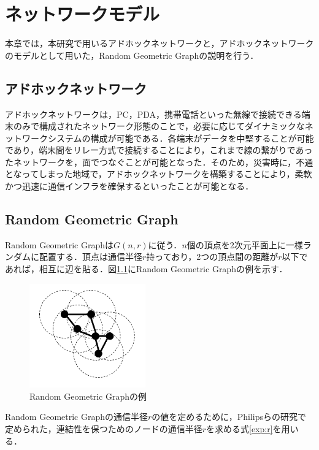 \documentclass[11pt]{jreport}
\begin{document}
\chapter{ネットワークモデル}
本章では，本研究で用いるアドホックネットワークと，アドホックネットワークのモデルとして用いた，Random Geometric Graphの説明を行う．

\section{アドホックネットワーク}
アドホックネットワークは，PC，PDA，携帯電話といった無線で接続できる端末のみで構成されたネットワーク形態のことで，必要に応じてダイナミックなネットワークシステムの構成が可能である．各端末がデータを中堅することが可能であり，端末間をリレー方式で接続することにより，これまで線の繋がりであったネットワークを，面でつなぐことが可能となった．そのため，災害時に，不通となってしまった地域で，アドホックネットワークを構築することにより，柔軟かつ迅速に通信インフラを確保するといったことが可能となる\cite{nomura}．

\section{Random Geometric Graph}
Random Geometric Graphは$G(n, r)$に従う．$n$個の頂点を2次元平面上に一様ランダムに配置する．頂点は通信半径$r$持っており，2つの頂点間の距離が$r$以下であれば，相互に辺を貼る\cite{jesper}．図\ref{fig:rgg}にRandom Geometric Graphの例を示す．

\begin{figure}[htbp]
	\begin{center}
		\includegraphics[width=5.0cm]{./figure/rgg.png}
	\end{center}
	\caption{Random Geometric Graphの例}
	\label{fig:rgg}
\end{figure}

\par Random Geometric Graphの通信半径$r$の値を定めるために，Philipsら\cite{thomas}の研究で定められた，連結性を保つためのノードの通信半径$r$を求める式\ref{exp:r}を用いる．
\end{document}
